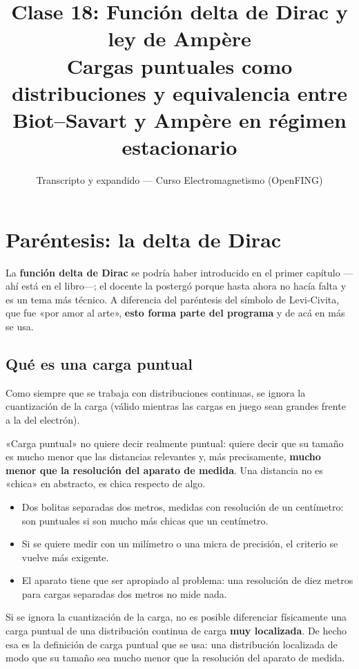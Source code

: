 \documentclass[12pt,a4paper]{article}
\title{\textbf{Clase 18: Función delta de Dirac y ley de Ampère} \\[0.3em]
        \large{Cargas puntuales como distribuciones y equivalencia entre Biot--Savart y Ampère en régimen estacionario}}
\author{Transcripto y expandido --- Curso Electromagnetismo (OpenFING)}
\date{}
\begin{document}
\maketitle
\thispagestyle{empty}
\newpage

\tableofcontents
\newpage

\section{Paréntesis: la delta de Dirac}

La \textbf{función delta de Dirac} se podría haber introducido en el primer capítulo
---ahí está en el libro---; el docente la postergó porque hasta ahora no hacía
falta y es un tema más técnico. A diferencia del paréntesis del símbolo de
Levi-Civita, que fue «por amor al arte», \textbf{esto forma parte del programa} y de
acá en más se usa.

\subsection{Qué es una carga puntual}

Como siempre que se trabaja con distribuciones continuas, se ignora la
cuantización de la carga (válido mientras las cargas en juego sean grandes
frente a la del electrón).

«Carga puntual» no quiere decir realmente puntual: quiere decir que su tamaño
es mucho menor que las distancias relevantes y, más precisamente, \textbf{mucho menor
que la resolución del aparato de medida}. Una distancia no es «chica» en
abstracto, es chica respecto de algo.

\begin{itemize}
  \item Dos bolitas separadas dos metros, medidas con resolución de un centímetro:
  son puntuales si son mucho más chicas que un centímetro.
  \item Si se quiere medir con un milímetro o una micra de precisión, el criterio se
  vuelve más exigente.
  \item El aparato tiene que ser apropiado al problema: una resolución de diez metros
  para cargas separadas dos metros no mide nada.
\end{itemize}

\begin{notebox}
Si se ignora la cuantización de la carga, no es posible
diferenciar físicamente una carga puntual de una distribución continua de
carga \textbf{muy localizada}. De hecho esa es la definición de carga puntual que
se usa: una distribución localizada de modo que su tamaño sea mucho menor que
la resolución del aparato de medida.
\end{notebox}
\end{document}
